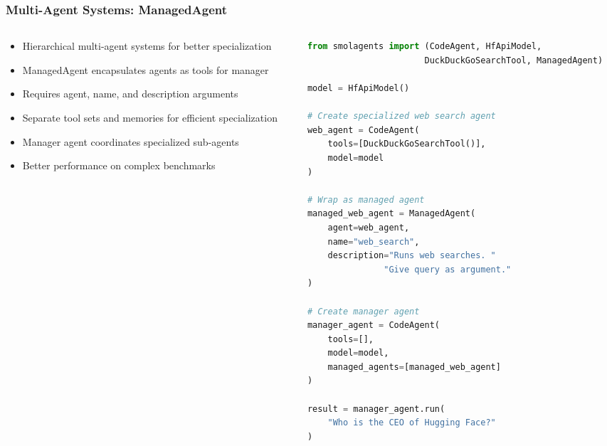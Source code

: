 \begin{frame}[fragile]\frametitle{Multi-Agent Systems: ManagedAgent}
\begin{columns}
\begin{column}{0.5\textwidth}
      \begin{itemize}
	\item Hierarchical multi-agent systems for better specialization
	\item ManagedAgent encapsulates agents as tools for manager
	\item Requires agent, name, and description arguments
	\item Separate tool sets and memories for efficient specialization
	\item Manager agent coordinates specialized sub-agents
	\item Better performance on complex benchmarks
	  \end{itemize}
\end{column}
\begin{column}{0.5\textwidth}
\begin{lstlisting}[language=Python, basicstyle=\tiny]
from smolagents import (CodeAgent, HfApiModel, 
                       DuckDuckGoSearchTool, ManagedAgent)

model = HfApiModel()

# Create specialized web search agent
web_agent = CodeAgent(
    tools=[DuckDuckGoSearchTool()], 
    model=model
)

# Wrap as managed agent
managed_web_agent = ManagedAgent(
    agent=web_agent,
    name="web_search",
    description="Runs web searches. "
               "Give query as argument."
)

# Create manager agent
manager_agent = CodeAgent(
    tools=[], 
    model=model, 
    managed_agents=[managed_web_agent]
)

result = manager_agent.run(
    "Who is the CEO of Hugging Face?"
)
\end{lstlisting}
\end{column}
\end{columns}
\end{frame}

